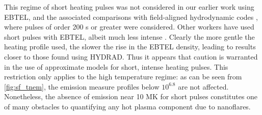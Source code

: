 \documentclass[iop]{emulateapj}
\begin{document}
	\par This regime of short heating pulses was not considered in our earlier work using EBTEL, and the associated comparisons with field-aligned hydrodynamic codes \citep{klimchuk_highly_2008,cargill_enthalpy-based_2012}, where pulses of order 200 s or greater were considered. Other workers have used short pulses with EBTEL, albeit much less intense \citep{tajfirouze_euv_2016,tajfirouze_time-resolved_2016}. Clearly the more gentle the heating profile used, the slower the rise in the EBTEL density, leading to results closer to those found using HYDRAD. Thus it appears that caution is warranted in the use of approximate models for short, intense heating pulses. This restriction only applies to the high temperature regime: as can be seen from \autoref{fig:sf_tnem}, the emission measure profiles below $10^{6.8}$ are not affected. Nonetheless, the absence of emission near 10 MK for short pulses constitutes one of many obstacles to quantifying any hot plasma component due to nanoflares.
\end{document}
